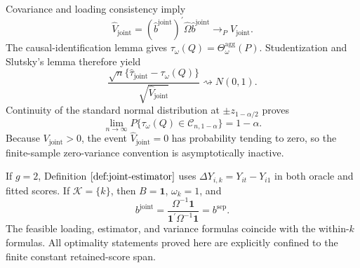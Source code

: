 Covariance and loading consistency imply
\[
 \widehat V_{\mathrm{joint}}
 = (\widehat b^{\mathrm{joint}})^{\prime}
   \widehat\Omega\widehat b^{\mathrm{joint}}
 \to_PV_{\mathrm{joint}}.
\]
The causal-identification lemma gives \(\tau_\omega(Q)=\Theta_\omega^{\mathrm{agg}}(P)\). Studentization and Slutsky's lemma therefore yield
\[
 \frac{\sqrt n\{\widehat\tau_{\mathrm{joint}}-\tau_\omega(Q)\}}
      {\sqrt{\widehat V_{\mathrm{joint}}}}
 \rightsquigarrow N(0,1).
\]
Continuity of the standard normal distribution at \(\pm z_{1-\alpha/2}\) proves
\[
 \lim_{n\to\infty}P\{\tau_\omega(Q)\in\mathcal C_{n,1-\alpha}\}=1-\alpha.
\]
Because \(V_{\mathrm{joint}}>0\), the event \(\widehat V_{\mathrm{joint}}=0\) has probability tending to zero, so the finite-sample zero-variance convention is asymptotically inactive.

If \(g=2\), Definition \(\ref{def:joint-estimator}\) uses \(\Delta Y_{i,k}=Y_{it}-Y_{i1}\) in both oracle and fitted scores. If \(\mathcal K=\{k\}\), then \(B=\mathbf 1\), \(\omega_k=1\), and
\[
 b^{\mathrm{joint}}
 =\frac{\Omega^{-1}\mathbf 1}{\mathbf 1^{\prime}\Omega^{-1}\mathbf 1}
 =b^{\mathrm{sep}}.
\]
The feasible loading, estimator, and variance formulas coincide with the within-\(k\) formulas. All optimality statements proved here are explicitly confined to the finite constant retained-score span.